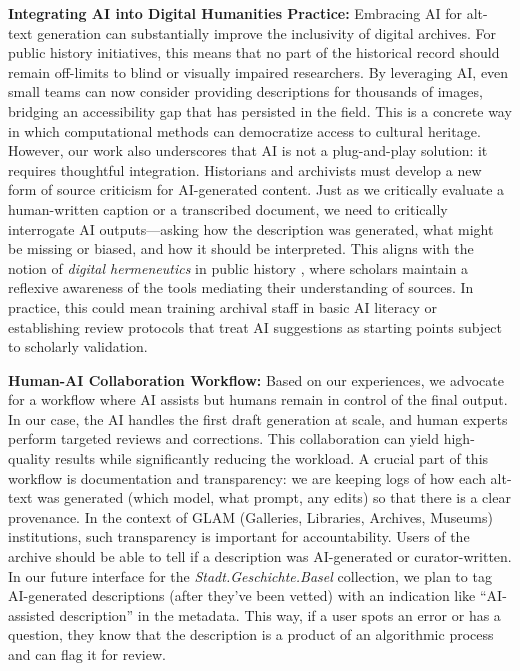 \documentclass{anthology-ch}         %
\begin{document}
\textbf{Integrating AI into Digital Humanities Practice:} Embracing AI for alt-text generation can substantially improve the inclusivity of digital archives. For public history initiatives, this means that no part of the historical record should remain off-limits to blind or visually impaired researchers. By leveraging AI, even small teams can now consider providing descriptions for thousands of images, bridging an accessibility gap that has persisted in the field. This is a concrete way in which computational methods can democratize access to cultural heritage. However, our work also underscores that AI is not a plug-and-play solution: it requires thoughtful integration. Historians and archivists must develop a new form of source criticism for AI-generated content. Just as we critically evaluate a human-written caption or a transcribed document, we need to critically interrogate AI outputs---asking how the description was generated, what might be missing or biased, and how it should be interpreted. This aligns with the notion of \emph{digital hermeneutics} in public history \autocite{fickers2022}, where scholars maintain a reflexive awareness of the tools mediating their understanding of sources. In practice, this could mean training archival staff in basic AI literacy or establishing review protocols that treat AI suggestions as starting points subject to scholarly validation.

\textbf{Human-AI Collaboration Workflow:} Based on our experiences, we advocate for a workflow where AI assists but humans remain in control of the final output. In our case, the AI handles the first draft generation at scale, and human experts perform targeted reviews and corrections. This collaboration can yield high-quality results while significantly reducing the workload. A crucial part of this workflow is documentation and transparency: we are keeping logs of how each alt-text was generated (which model, what prompt, any edits) so that there is a clear provenance. In the context of GLAM (Galleries, Libraries, Archives, Museums) institutions, such transparency is important for accountability. Users of the archive should be able to tell if a description was AI-generated or curator-written. In our future interface for the \emph{Stadt.Geschichte.Basel} collection, we plan to tag AI-generated descriptions (after they’ve been vetted) with an indication like ``AI-assisted description'' in the metadata. This way, if a user spots an error or has a question, they know that the description is a product of an algorithmic process and can flag it for review.
\end{document}
